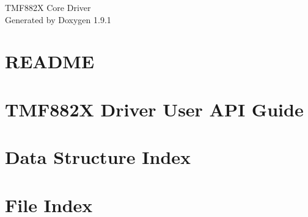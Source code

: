 \let\mypdfximage\pdfximage\def\pdfximage{\immediate\mypdfximage}\documentclass[twoside]{book}
\newcommand{\+}{\discretionary{\mbox{\scriptsize$\hookleftarrow$}}{}{}}
\newcommand{\clearemptydoublepage}{%
  \newpage{\pagestyle{empty}\cleardoublepage}%
}
\begin{document}
\raggedbottom

\hypersetup{pageanchor=false,
             bookmarksnumbered=true,
             pdfencoding=unicode
            }
\begin{titlepage}
\vspace*{7cm}
\begin{center}%
{\Large TMF882X Core Driver }\\
\vspace*{1cm}
{\large Generated by Doxygen 1.9.1}\\
\end{center}
\end{titlepage}
\clearemptydoublepage
{}
\tableofcontents
\clearemptydoublepage
{}
\hypersetup{pageanchor=true}

\chapter{README}
\label{md_README}

\chapter{TMF882X Driver User API Guide}
\label{md_TMF882X_Driver_UAPI_Guide}

\chapter{Data Structure Index}

\chapter{File Index}

\end{document}
